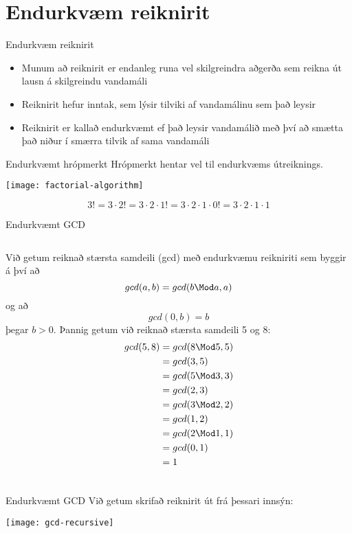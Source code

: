 \documentclass{beamer}
\begin{document}
\section{Endurkvæm reiknirit}

\begin{frame}{Endurkvæm reiknirit}
\begin{itemize}
 \item Munum að reiknirit er endanleg runa vel skilgreindra aðgerða sem reikna út lausn á skilgreindu vandamáli
 \item Reiknirit hefur inntak, sem lýsir tilviki af vandamálinu sem það leysir
 \item Reiknirit er kallað endurkvæmt ef það leysir vandamálið með því að smætta það niður í smærra tilvik af sama vandamáli
\end{itemize}
\end{frame}

\begin{frame}{Endurkvæmt hrópmerkt}
Hrópmerkt hentar vel til endurkvæms útreiknings.
\begin{center}
\texttt{[image: factorial-algorithm]}
\end{center}
\[
3! = 3\cdot 2! = 3 \cdot 2 \cdot 1! = 3 \cdot 2 \cdot 1 \cdot 0! = 3 \cdot 2 \cdot 1 \cdot 1
\]
\end{frame}

\begin{frame}{Endurkvæmt GCD}
\begin{columns}
Við getum reiknað stærsta samdeili (gcd) með endurkvæmu reikniriti sem byggir á því að 
\[
 gcd(a,b) = gcd(b \Mod a, a)
\]
og að 
\[
 gcd(0,b) = b
\]
þegar $b > 0$.
Þannig getum við reiknað stærsta samdeili 5 og 8:
\begin{align*}
gcd(5,8) &= gcd(8 \Mod 5, 5)\\
&= gcd(3,5)\\
&= gcd(5 \Mod 3, 3)\\
&= gcd(2,3)\\
&= gcd(3 \Mod 2, 2)\\
&= gcd(1,2)\\
&= gcd(2 \Mod 1, 1)\\
&= gcd(0,1)\\
&= 1
\end{align*}

\end{columns}
\end{frame}

\begin{frame}{Endurkvæmt GCD}
Við getum skrifað reiknirit út frá þessari innsýn:
\begin{center}
\texttt{[image: gcd-recursive]}
\end{center}
\end{frame}
\end{document}
